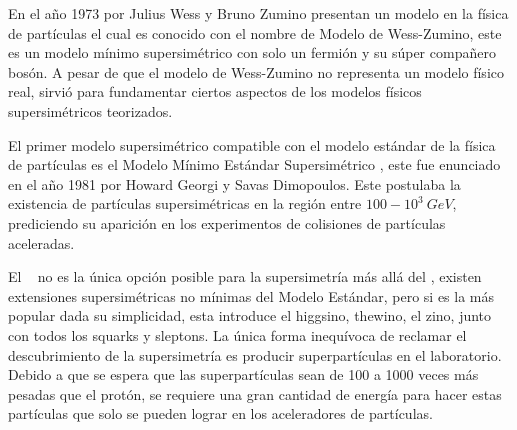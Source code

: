 
En el año 1973 por Julius Wess y Bruno Zumino presentan un modelo en la física de partículas el cual es conocido con el nombre de Modelo de Wess-Zumino, este es un modelo mínimo supersimétrico con solo un fermión y su súper compañero bosón. A pesar de que el modelo de Wess-Zumino no representa un modelo físico real, sirvió para fundamentar ciertos aspectos de los modelos físicos supersimétricos teorizados. 


El primer modelo supersimétrico compatible con el modelo estándar de la física de partículas es el Modelo Mínimo Estándar Supersimétrico \MSSM, este fue enunciado en el año 1981 por Howard Georgi y Savas Dimopoulos. Este postulaba la existencia de partículas supersimétricas en la región entre $100-10^3~GeV$, prediciendo su aparición en los experimentos de colisiones de partículas aceleradas. %

El \MSSM ~ no es la única opción posible para la supersimetría más allá del \ME, existen extensiones supersimétricas no mínimas del Modelo Estándar, pero si es la más popular dada su simplicidad, esta introduce el higgsino, thewino, el zino, junto con todos los squarks y sleptons. 
La única forma inequívoca de reclamar el descubrimiento de la supersimetría es producir superpartículas en el laboratorio. Debido a que se espera que las superpartículas sean de 100 a 1000 veces más pesadas que el protón, se requiere una gran cantidad de energía para hacer estas partículas que solo se pueden lograr en los aceleradores de partículas. %

